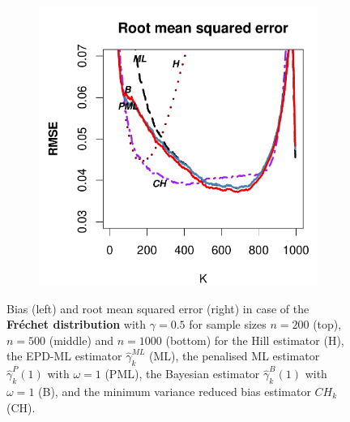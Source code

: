 \begin{figure}[h]
\begin{subfigure}[h]{0.40\linewidth}
		\end{subfigure}
		\hspace{\fill}
		\begin{subfigure}[h]{0.40\linewidth}
			\includegraphics[width=\textwidth]{./plots/paper1/RMSE_Outputfrehet0,51000.pdf}
		\end{subfigure}
		\caption{Bias (left) and root mean squared error (right) in case of the \textbf{Fr\'echet distribution} with $\gamma=0.5$ for sample sizes $n=200$ (top), $n=500$ (middle) and $n=1000$ (bottom) for the Hill estimator (H), the EPD-ML estimator $\hat{\gamma}_{k}^{ML}$ (ML), the penalised ML estimator $\hat{\gamma}^P_{k}(1)$ with $\omega=1$ (PML), the Bayesian estimator $\hat{\gamma}^B_{k}(1)$ with $\omega=1$ (B), and the minimum variance reduced bias estimator $CH_k$ (CH).}
		\label{paper1:fig2}
	\end{figure}

